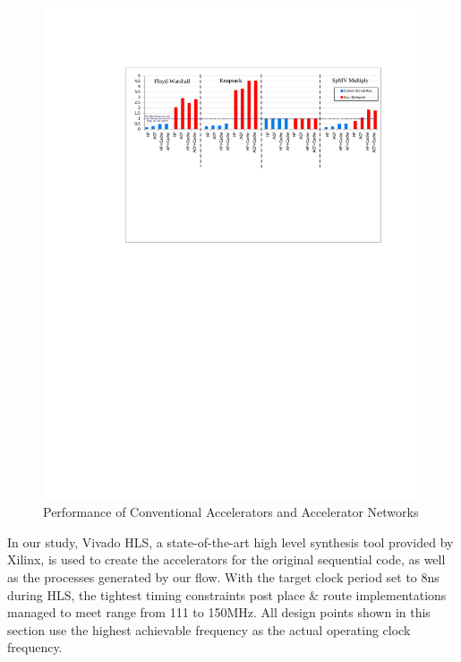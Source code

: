 \documentclass{sig-alternate}
\begin{document}
\begin{table}[htbp]
\begin{tabular}{| c | c | c | }
  \hline      
  
\end{tabular}
\vspace{-2.0em}
\label{tab:datasize}
\end{table}



\begin{figure}[htp]
\begin{center}
\includegraphics[width=0.95\linewidth]{fig/perfNew.pdf}
\caption{Performance of Conventional Accelerators and Accelerator Networks
\label{fig:acpraw}}
\end{center}
\vspace{-2.9em}
\end{figure} 


In our study, Vivado HLS, a state-of-the-art high level synthesis tool provided by Xilinx,
is used to create the accelerators for the original sequential code, as well as the processes generated by our flow. With the target clock period set to 
8ns during HLS, the tightest timing constraints post place \& route implementations managed to meet range from 111 to 150MHz. 
All design points shown in this section 
use the highest achievable frequency as the actual operating clock frequency. 
\end{document}
